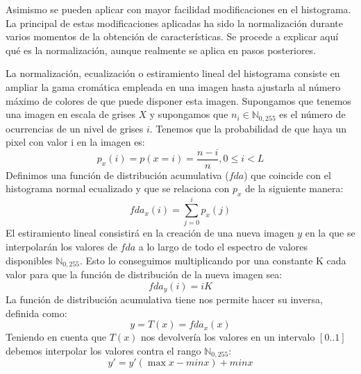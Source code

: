 Asimismo se pueden aplicar con mayor facilidad modificaciones en el histograma. La principal de estas modificaciones aplicadas ha sido la normalización durante varios momentos de la obtención de características. Se procede a explicar aquí qué es la normalización, aunque realmente se aplica en pasos posteriores.

La normalización, ecualización o estiramiento lineal del histograma consiste en ampliar la gama cromática empleada en una imagen hasta ajustarla al número máximo de colores de que puede disponer esta imagen. Supongamos que tenemos una imagen en escala de grises ${X}$ y supongamos que $n_{i} \in \mathbb{N}_{0,255}$ es el número de ocurrencias de un nivel de grises $i$. Tenemos que la probabilidad de que haya un pixel con valor i en la imagen es:
\[
	p_{x}(i) = p(x=i)=\frac{n-{i}}{n}, 0 \leq i < L
\]
Definimos una función de distribución acumulativa ($fda$) que coincide con el histograma normal ecualizado y que se relaciona con $p_{x}$ de la siguiente manera:
\[
	fda_{x}(i) = \sum_{j=0}^{i}p_{x}(j)
\]
El estiramiento lineal consistirá en la creación de una nueva imagen $y$ en la que se interpolarán los valores de $fda$ a lo largo de todo el espectro de valores disponibles $\mathbb{N}_{0,255}$. Esto lo conseguimos multiplicando por una constante K cada valor para que la función de distribución de la nueva imagen sea:
\[
	fda_{y}(i)=iK
\]
La función de distribución acumulativa tiene nos permite hacer su inversa, definida como:
\[
	y = T(x) = fda_{x}(x)
\]
Teniendo en cuenta que $T(x)$ nos devolvería los valores en un intervalo $\left[0..1\right]$ debemos interpolar los valores contra el rango $\mathbb{N}_{0,255}$:
\[
	y' = y' (\max{x} - min {x}) + min{x}
\]


